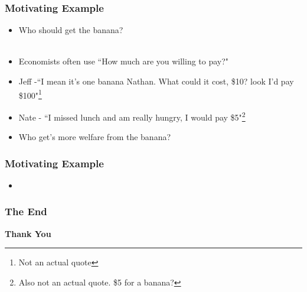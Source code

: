\documentclass{beamer}
\begin{document}
\begin{frame}
\frametitle{Motivating Example}

	\begin{itemize}
			\setlength{\itemsep}{5mm}
		\large
	\item Who should get the banana? \\\\

	\item Economists often use ``How much are you willing to pay?" 
	
		\item Jeff -``I mean it’s one banana Nathan. What could it cost, \$10? look I'd pay \$100"\footnote[frame]{Not an actual quote} 
		
		\item Nate - ``I missed lunch and am really hungry, I would pay \$5"\footnote[frame]{Also not an actual quote. \$5 for a banana?} 
		
		\item Who get's more welfare from the banana?
			
	\end{itemize}


\end{frame}

\begin{frame}
\frametitle{Motivating Example}

\begin{itemize}
	\setlength{\itemsep}{8mm}
	\large
	\item 
\end{itemize}


\end{frame}


\begin{frame}

\frametitle{The End }

\begin{center}
	
\begin{Huge}
\textbf{Thank You}
\end{Huge}
\end{center}
\end{frame}

\end{document}
